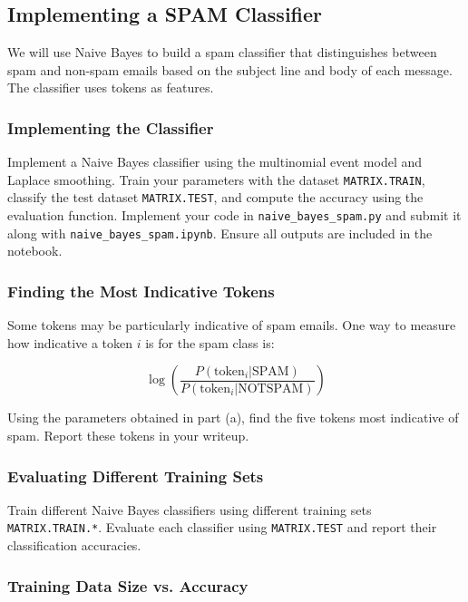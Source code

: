 \documentclass[lang=cn,11pt]{elegantbook}
\begin{document}
\subsection{Implementing a SPAM Classifier}

We will use Naive Bayes to build a spam classifier that distinguishes between spam and non-spam emails based on the subject line and body of each message. The classifier uses tokens as features.

\subsubsection{Implementing the Classifier}

Implement a Naive Bayes classifier using the multinomial event model and Laplace smoothing. Train your parameters with the dataset \texttt{MATRIX.TRAIN}, classify the test dataset \texttt{MATRIX.TEST}, and compute the accuracy using the evaluation function. Implement your code in \texttt{naive\_bayes\_spam.py} and submit it along with \texttt{naive\_bayes\_spam.ipynb}. Ensure all outputs are included in the notebook.

\subsubsection{Finding the Most Indicative Tokens}

Some tokens may be particularly indicative of spam emails. One way to measure how indicative a token $i$ is for the spam class is:

\begin{equation}
    \log \left( \frac{P(\text{token}_i | \text{SPAM})}{P(\text{token}_i | \text{NOTSPAM})} \right)
\end{equation}

Using the parameters obtained in part (a), find the five tokens most indicative of spam. Report these tokens in your writeup.

\subsubsection{Evaluating Different Training Sets}

Train different Naive Bayes classifiers using different training sets \texttt{MATRIX.TRAIN.*}. Evaluate each classifier using \texttt{MATRIX.TEST} and report their classification accuracies.

\subsubsection{Training Data Size vs. Accuracy}
\end{document}
